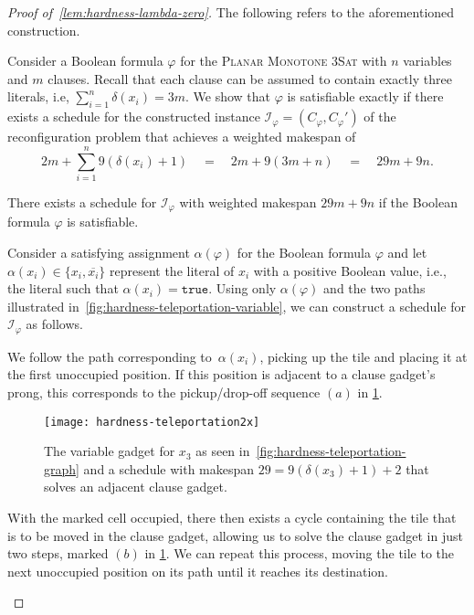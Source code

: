 \begin{proof}[Proof of~\cref{lem:hardness-lambda-zero}]
	The following refers to the aforementioned construction.

	Consider a Boolean formula $\varphi$ for the \textsc{Planar Monotone 3Sat} with $n$ variables and $m$ clauses.
	Recall that each clause can be assumed to contain exactly three literals, i.e, $\sum_{i=1}^{n}\delta(x_i) = 3m$.
	We show that $\varphi$ is satisfiable exactly if there exists a schedule for the constructed instance $\mathcal{I}_\varphi = (C_\varphi, C_\varphi')$ of the reconfiguration problem that achieves a weighted makespan of
	\begin{equation}
		\label{eq:sat-hardness-makespan}
		2m + \sum_{i=1}^{n}9(\delta(x_i)+1)\quad =\quad 2m + 9(3m+n)\quad =\quad 29m+9n.
	\end{equation}
	\begin{claim}
		\label{clm:hardness-teleportation-positive}
		There exists a schedule for $\mathcal{I}_\varphi$ with weighted makespan $29m+9n$ if the Boolean formula $\varphi$ is satisfiable.
	\end{claim}
	\begin{claimproof}
		Consider a satisfying assignment $\alpha(\varphi)$ for the Boolean formula $\varphi$ and let~$\alpha(x_i) \in\{{x_i},\overline{x_i}\}$ represent the literal of $x_i$ with a positive Boolean value, i.e., the literal such that $\alpha(x_i)=\texttt{true}$.
		Using only $\alpha(\varphi)$ and the two paths illustrated in~\cref{fig:hardness-teleportation-variable}, we can construct a schedule for $\mathcal{I}_\varphi$ as follows.

		We follow the path corresponding to~$\alpha(x_i)$, picking up the tile and placing it at the first unoccupied position.
		If this position is adjacent to a clause gadget's prong, this corresponds to the pickup/drop-off sequence $(a)$ in \cref{fig:hardness-teleportation-variable-example}.
		\begin{figure}[htb]
			\centering%
			\texttt{[image: hardness-teleportation2x]}%
			\caption{The variable gadget for $x_3$ as seen in~\cref{fig:hardness-teleportation-graph} and a schedule with makespan $29=9(\delta(x_3)+1) + 2$ that solves an adjacent clause gadget.}%
			\label{fig:hardness-teleportation-variable-example}%
		\end{figure}
		With the marked cell occupied, there then exists a cycle containing the tile that is to be moved in the clause gadget, allowing us to solve the clause gadget in just two steps, marked $(b)$ in \cref{fig:hardness-teleportation-variable-example}.
		We can repeat this process, moving the tile to the next unoccupied position on its path until it reaches its destination.


\end{claimproof}
\end{proof}
